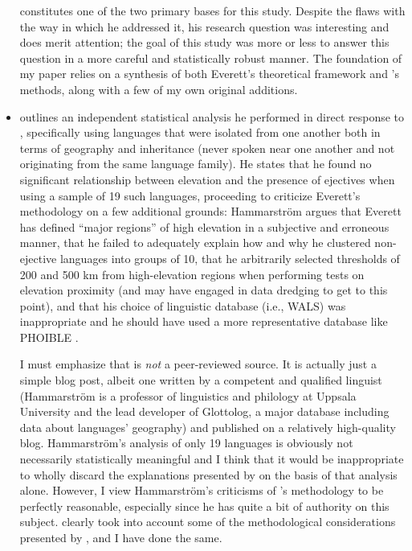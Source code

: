 \documentclass{article}
\begin{document}
\begin{itemize}
\textcite{everett2013} constitutes one of the two primary bases for this study. Despite the flaws with the way in which he addressed it, his research question was interesting and does merit attention; the goal of this study was more or less to answer this question in a more careful and statistically robust manner. The foundation of my paper relies on a synthesis of both Everett's theoretical framework and \textcite{urban2021}'s methods, along with a few of my own original additions.

\item \textbf{}

\textcite{hammarstroem2013} outlines an independent statistical analysis he performed in direct response to \textcite{everett2013}, specifically using languages that were isolated from one another both in terms of geography and inheritance (never spoken near one another and not originating from the same language family). He states that he found no significant relationship between elevation and the presence of ejectives when using a sample of 19 such languages, proceeding to criticize Everett's methodology on a few additional grounds: Hammarström argues that Everett has defined ``major regions'' of high elevation in a subjective and erroneous manner, that he failed to adequately explain how and why he clustered non-ejective languages into groups of 10, that he arbitrarily selected thresholds of 200 and 500 km from high-elevation regions when performing tests on elevation proximity (and may have engaged in data dredging to get to this point), and that his choice of linguistic database (i.e., WALS) was inappropriate and he should have used a more representative database like PHOIBLE \parencite{phoible}.

I must emphasize that \textcite{hammarstroem2013} is \emph{not} a peer-reviewed source. It is actually just a simple blog post, albeit one written by a competent and qualified linguist (Hammarström is a professor of linguistics and philology at Uppsala University and the lead developer of Glottolog, a major database including data about languages' geography) and published on a relatively high-quality blog. Hammarström's analysis of only 19 languages is obviously not necessarily statistically meaningful and I think that it would be inappropriate to wholly discard the explanations presented by \textcite{everett2013} on the basis of that analysis alone. However, I view Hammarström's criticisms of \textcite{everett2013}'s methodology to be perfectly reasonable, especially since he has quite a bit of authority on this subject. \textcite{urban2021} clearly took into account some of the methodological considerations presented by \textcite{hammarstroem2013}, and I have done the same. 


\end{itemize}
\end{document}
